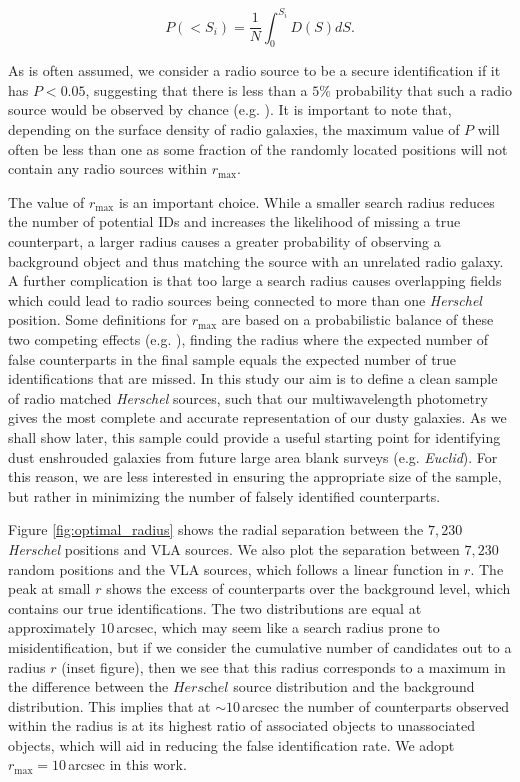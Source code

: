 \begin{equation}
    P(< S_i) = \frac{1}{N}\int_0^{S_i}D(S) dS.
    \label{eq:probability_frequentist}
\end{equation}

As is often assumed, we consider a radio source to be a secure identification if it has $P < 0.05$, suggesting that there is less than a $5\%$ probability that such a radio source would be observed by chance (e.g. \citealt{Ivison_2002, Ivison_2005, Pope_2006}). It is important to note that, depending on the surface density of radio galaxies, the maximum value of $P$ will often be less than one as some fraction of the randomly located positions will not contain any radio sources within $r_{\textrm{max}}$. 

The value of $r_{\textrm{max}}$ is an important choice. While a smaller search radius reduces the number of potential IDs and increases the likelihood of missing a true counterpart, a larger radius causes a greater probability of observing a background object and thus matching the source with an unrelated radio galaxy. A further complication is that too large a search radius causes overlapping fields which could lead to radio sources being connected to more than one \textit{Herschel} position. Some definitions for $r_{\textrm{max}}$ are based on a probabilistic balance of these two competing effects (e.g. \citealt{Dye_2009}), finding the radius where the expected number of false counterparts in the final sample equals the expected number of true identifications that are missed. In this study our aim is to define a clean sample of radio matched \textit{Herschel} sources, such that our multiwavelength photometry gives the most complete and accurate representation of our dusty galaxies. As we shall show later, this sample could provide a useful starting point for identifying dust enshrouded galaxies from future large area blank surveys (e.g. \textit{Euclid}). For this reason, we are less interested in ensuring the appropriate size of the sample, but rather in minimizing the number of falsely identified counterparts.

Figure \ref{fig:optimal_radius} shows the radial separation between the $7,230$ \textit{Herschel} positions and VLA sources. We also plot the separation between $7,230$ random positions and the VLA sources, which follows a linear function in $r$. The peak at small $r$ shows the excess of counterparts over the background level, which contains our true identifications. The two distributions are equal at approximately $10\,$arcsec, which may seem like a search radius prone to misidentification, but if we consider the cumulative number of candidates out to a radius $r$ (inset figure), then we see that this radius corresponds to a maximum in the difference between the $\textit{Herschel}$ source distribution and the background distribution. This implies that at $\sim 10\,$arcsec the number of counterparts observed within the radius is at its highest ratio of associated objects to unassociated objects, which will aid in reducing the false identification rate. We adopt $r_{\textrm{max}} = 10\,$arcsec in this work.

